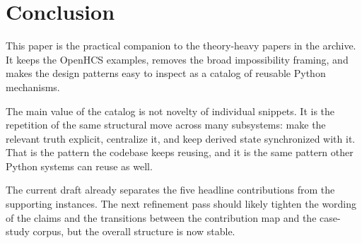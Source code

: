 \section{Conclusion}

This paper is the practical companion to the theory-heavy papers in the archive. It keeps the OpenHCS examples, removes the broad impossibility framing, and makes the design patterns easy to inspect as a catalog of reusable Python mechanisms.

The main value of the catalog is not novelty of individual snippets. It is the repetition of the same structural move across many subsystems: make the relevant truth explicit, centralize it, and keep derived state synchronized with it. That is the pattern the codebase keeps reusing, and it is the same pattern other Python systems can reuse as well.

The current draft already separates the five headline contributions from the supporting instances. The next refinement pass should likely tighten the wording of the claims and the transitions between the contribution map and the case-study corpus, but the overall structure is now stable.
